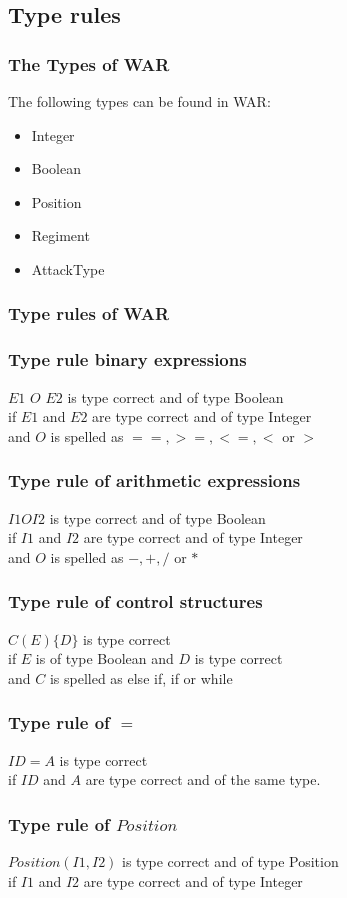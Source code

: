 \subsection{Type rules}
	\subsubsection{The Types of WAR}
		The following types can be found in WAR: \\
		\begin{itemize}
			\item Integer
			\item Boolean
			\item Position
			\item Regiment
			\item AttackType
		\end{itemize}
		
	\subsubsection{Type rules of WAR}
	\subsubsection{Type rule binary expressions}
		$E1$ $O$ $E2$ is type correct and of type Boolean\\
		if $E1$ and $E2$ are type correct and of type Integer \\
		and $O$ is spelled as $==,>=,<=,<$ or $>$
		
	\subsubsection{Type rule of arithmetic expressions}
		$I1 O I2$ is type correct and of type Boolean \\
		if $I1$ and $I2$ are type correct and of type Integer \\
		and $O$ is spelled as $-,+,/$ or $*$

	\subsubsection{Type rule of control structures}
		$C(E)\{D\}$ is type correct\\
		if $E$ is of type Boolean and $D$ is type correct \\
		and $C$ is spelled as else if, if or while
		
	\subsubsection*{Type rule of $=$}
		$ID = A$ is type correct\\
		if $ID$ and $A$ are type correct and of the same type.
		
	\subsubsection*{Type rule of $Position$}
		$Position(I1,I2)$ is type correct and of type Position\\
		if $I1$ and $I2$ are type correct and of type Integer
	